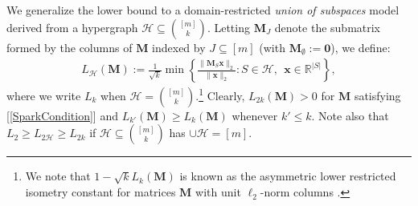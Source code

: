 \documentclass[9pt,twocolumn]{pnas-new}
\renewcommand{\eqref}[1]{\textnormal{[\ref{#1}]}}
\begin{document}
We generalize the  lower bound to a domain-restricted \emph{union of subspaces} model \cite{vidal2005generalized} derived from a hypergraph $\mathcal{H} \subseteq {[m] \choose k}$. Letting $\mathbf{M}_J$ denote the submatrix formed by the columns of $\mathbf{M}$ indexed by $J \subseteq [m]$ (with $\mathbf{M}_\emptyset := \mathbf{0}$), we define: 
%
\begin{align}\label{Ldef}
L_\mathcal{H}(\mathbf{M}) := \frac{1}{\sqrt{k}} \min \left\{ \frac{\|\mathbf{M}_S\mathbf{x}\|_2}{ \|\mathbf{x}\|_2} : S \in \mathcal{H}, \ \ \mathbf{x} \in \mathbb{R}^{|S|} \right\},
\end{align} 
%
where we write $L_{k}$ when $\mathcal{H} = {[m] \choose k}$.\footnote{We note that $1 - \sqrt{k} L_k(\mathbf{M})$ is known as the asymmetric lower restricted isometry constant for matrices $\mathbf{M}$ with unit $\ell_2$-norm columns \cite{Blanchard2011}.} Clearly, $L_{2k}(\mathbf{M}) > 0$ for $\mathbf{M}$ satisfying \eqref{SparkCondition} and $L_{k'}(\mathbf{M}) \geq L_k(\mathbf{M})$ whenever $k' \leq k$. Note also that $L_2 \geq L_{2\mathcal{H}} \geq L_{2k}$ if $\mathcal{H} \subseteq {[m] \choose k}$ has $\cup \mathcal{H} = [m]$.
 
\end{document}
